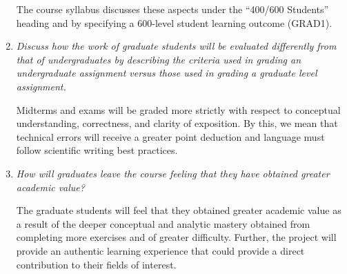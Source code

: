 \documentclass[11pt,onecolumn]{article}
\begin{document}
\begin{enumerate}
  The course syllabus discusses these aspects under the ``400/600 Students'' heading and by specifying a 600-level student learning outcome (\textsc{GRAD1}).


  
\item \emph{Discuss how the work of graduate students will be evaluated differently from that of undergraduates by describing the criteria used in grading an undergraduate assignment versus those used in grading a graduate level assignment.}

  Midterms and exams will be graded more strictly with respect to conceptual understanding, correctness, and clarity of exposition. By this, we mean that technical errors will receive a greater point deduction and language must follow scientific writing best practices.

\item \emph{How will graduates leave the course feeling that they have obtained greater academic value?}


  The graduate students will feel that they obtained greater academic value as a result of the deeper conceptual and analytic mastery obtained from completing more exercises and of greater difficulty. Further, the project will provide an authentic learning experience that could provide a direct contribution to their fields of interest.
  
\end{enumerate}
\end{document}
